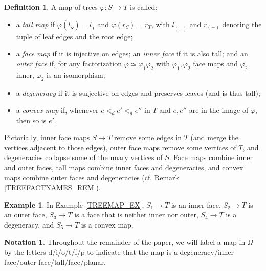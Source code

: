 \documentclass[a4paper,10pt
,draft
]{article}%
\numberwithin{equation}{section}
\numberwithin{figure}{section}
\theoremstyle{definition} %
\newtheorem{definition}[equation]{Definition}%
\newtheorem{example}[equation]{Example}%
\newtheorem{notation}[equation]{Notation}%
\newcommand{\1}{\ensuremath{\mathbbm 1}}%
\begin{document}
\begin{definition}
        \label{TREEMAP_DEF}
        A map of trees $\varphi \colon S \to T$ is called:
        \begin{itemize}
        \item a \textit{tall map} if
                $\varphi(\underline{l}_S) = \underline{l}_T$ and $\varphi(r_S) = r_T$,
                with $\underline{l}_{(-)}$ and $r_{(-)}$ denoting the tuple of leaf edges and the root edge;
        \item a \textit{face map} if it is injective on edges;
                an \textit{inner face} if it is also tall; and
                an \textit{outer face} if, for any factorization
                $\varphi \simeq \varphi_1\varphi_2$
                with $\varphi_1,\varphi_2$ face maps
                and $\varphi_2$ inner, 
                $\varphi_2$ is an isomorphism;
        \item a \textit{degeneracy} if it is surjective on edges and preserves leaves
                (and is thus tall);
        \item a \textit{convex map} if,
        	whenever $e <_d e' <_d e''$ in $T$ 
        	and $e,e''$ are in the image of $\varphi$,
        	then so is $e'$.
        \end{itemize}
\end{definition}

Pictorially, inner face maps 
$S \to T$ remove some edges in $T$
(and merge the vertices adjacent to those edges),
outer face maps remove some vertices of $T$,
and degeneracies collapse some of the unary vertices of $S$.
Face maps combine inner and outer faces,
tall maps combine inner faces and degeneracies, 
and convex maps combine outer faces and degeneracies (cf. Remark \ref{TREEFACTNAMES_REM}).


\begin{example}
	In Example \ref{TREEMAP_EX},
	$S_1 \to T$ is an inner face,
	$S_2 \to T$ is an outer face,
	$S_3 \to T$ is a face that is neither inner nor outer,
	$S_4 \to T$ is a degeneracy,
	and $S_5 \to T$ is a convex map.
\end{example}


\begin{notation}\label{MAPLABELS_NOT}
	Throughout the remainder of the paper,
        we will label a 
        map in $\Omega$
        by the letters d/i/o/t/f/p
        to indicate that the map is
        a degeneracy/inner face/outer face/tall/face/planar.
\end{notation}
\end{document}

